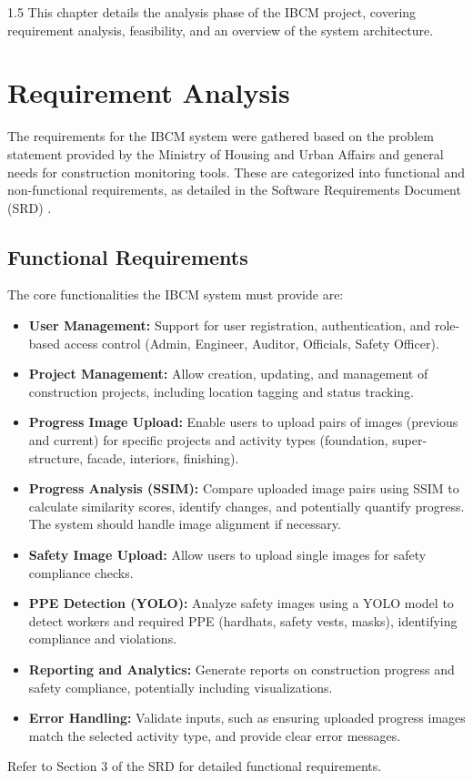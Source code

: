 \documentclass[12pt,a4paper]{report}
\begin{document}
\begin{spacing}{1.5}
    This chapter details the analysis phase of the IBCM project, covering requirement analysis, feasibility, and an overview of the system architecture.

    \section{Requirement Analysis}
    The requirements for the IBCM system were gathered based on the problem statement provided by the Ministry of Housing and Urban Affairs and general needs for construction monitoring tools. These are categorized into functional and non-functional requirements, as detailed in the Software Requirements Document (SRD) \cite{SRD_IBCM}. %

    \subsection{Functional Requirements}
    The core functionalities the IBCM system must provide are:
    \begin{itemize}
        \item \textbf{User Management:} Support for user registration, authentication, and role-based access control (Admin, Engineer, Auditor, Officials, Safety Officer).
        \item \textbf{Project Management:} Allow creation, updating, and management of construction projects, including location tagging and status tracking.
        \item \textbf{Progress Image Upload:} Enable users to upload pairs of images (previous and current) for specific projects and activity types (foundation, super-structure, facade, interiors, finishing).
        \item \textbf{Progress Analysis (SSIM):} Compare uploaded image pairs using SSIM to calculate similarity scores, identify changes, and potentially quantify progress. The system should handle image alignment if necessary.
        \item \textbf{Safety Image Upload:} Allow users to upload single images for safety compliance checks.
        \item \textbf{PPE Detection (YOLO):} Analyze safety images using a YOLO model to detect workers and required PPE (hardhats, safety vests, masks), identifying compliance and violations.
        \item \textbf{Reporting and Analytics:} Generate reports on construction progress and safety compliance, potentially including visualizations.
        \item \textbf{Error Handling:} Validate inputs, such as ensuring uploaded progress images match the selected activity type, and provide clear error messages.
    \end{itemize}
    Refer to Section 3 of the SRD \cite{SRD_IBCM} for detailed functional requirements.


\end{spacing}
\end{document}
